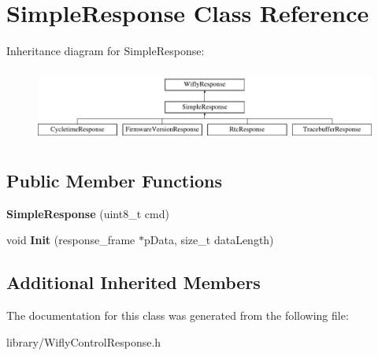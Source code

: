 \hypertarget{class_simple_response}{\section{Simple\-Response Class Reference}
\label{class_simple_response}
}
Inheritance diagram for Simple\-Response\-:\begin{figure}[H]
\begin{center}
\leavevmode
\includegraphics[height=2.441860cm]{class_simple_response}
\end{center}
\end{figure}
\subsection*{Public Member Functions}
\begin{DoxyCompactItemize}
\item 
\hypertarget{class_simple_response_aefac8d5010a3d168a206c78fbbd917ff}{{\bfseries Simple\-Response} (uint8\-\_\-t cmd)}\label{class_simple_response_aefac8d5010a3d168a206c78fbbd917ff}

\item 
\hypertarget{class_simple_response_a68f547257c77006d8dfc19192299b209}{void {\bfseries Init} (response\-\_\-frame $\ast$p\-Data, size\-\_\-t data\-Length)}\label{class_simple_response_a68f547257c77006d8dfc19192299b209}

\end{DoxyCompactItemize}
\subsection*{Additional Inherited Members}


The documentation for this class was generated from the following file\-:\begin{DoxyCompactItemize}
\item 
library/Wifly\-Control\-Response.\-h\end{DoxyCompactItemize}
